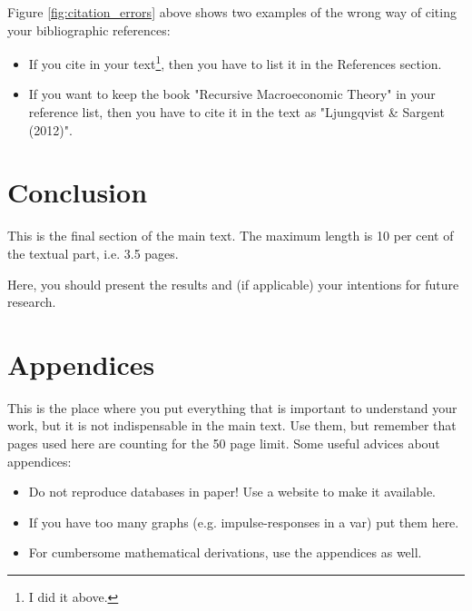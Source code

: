 \documentclass [12pt,a4paper,oneside]{article}
\begin{document}
Figure \ref{fig:citation_errors} above shows two examples of the wrong way of citing your bibliographic references:

\begin{itemize}
\item If you cite \cite{obstfeld_rogoff_1996} in your text\footnote{I did it above.}, then you have to list it in the References section.
\item If you want to keep the book "Recursive Macroeconomic Theory" in your reference list, then you have to cite it in the text as "Ljungqvist \& Sargent (2012)".
\end{itemize}

\newpage %
\section{Conclusion}

This is the final section of the main text. The maximum length is 10 per cent of the textual part, i.e. 3.5 pages.

Here, you should present the results and (if applicable) your intentions for future research.




\newpage %
\thispagestyle{plain}%





\newpage %
\thispagestyle{plain}%

\appendix
\section{Appendices} \label{chap:appendixA}


This is the place where you put everything that is important to understand your work, but it is not indispensable in the main text. Use them, but remember that pages used here are counting for the 50 page limit. Some useful advices about appendices:
\begin{itemize}
\item Do not reproduce databases in paper! Use a website to make it available.
\item If you have too many graphs (e.g. impulse-responses in a \gls{var}) put them here.
\item For cumbersome mathematical derivations, use the appendices as well.
\end{itemize}



\end{document}
